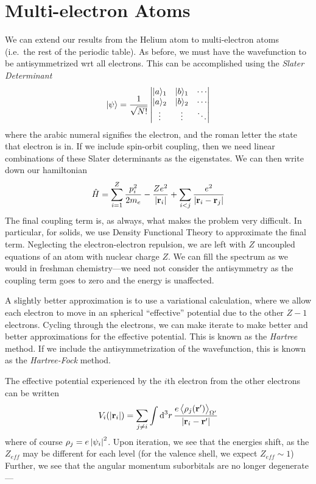 \section{Multi-electron Atoms}
We can extend our results from the Helium atom to multi-electron atoms (i.e.\ the rest of the periodic table). As before, we must have the wavefunction to be antisymmetrized wrt all electrons. This can be accomplished using the \emph{Slater Determinant}
\begin{equation}
	\lvert\psi\rangle = \frac{1}{\sqrt{N!}} \begin{vmatrix}
		\lvert a\rangle_1 & \lvert b\rangle_1 &\cdots\\
		\lvert a\rangle_2 & \lvert b\rangle_2 &\cdots\\
		\vdots & \vdots & \ddots
	\end{vmatrix}
\end{equation}
where the arabic numeral signifies the electron, and the roman letter the state that electron is in.
If we include spin-orbit coupling, then we need linear combinations of these Slater determinants as the eigenstates.
We can then write down our hamiltonian
\begin{equation}
	\hat H = \sum_{i=1}^Z\frac{p_i^2}{2m_e}-\frac{Ze^2}{\left|\mathbf{r}_i\right|}+\sum_{i<j}\frac{e^2}{\left|\mathbf{r}_i-\mathbf{r}_j\right|}
\end{equation}
The final coupling term is, as always, what makes the problem very difficult. In particular, for solids, we use Density Functional Theory to approximate the final term. Neglecting the electron-electron repulsion, we are left with \(Z\) uncoupled equations of an atom with nuclear charge \(Z\). We can fill the spectrum as we would in freshman chemistry---we need not consider the antisymmetry as the coupling term goes to zero and the energy is unaffected.

A slightly better approximation is to use a variational calculation, where we allow each electron to move in an spherical ``effective'' potential due to the other \(Z-1\) electrons. Cycling through the electrons, we can make iterate to make better and better approximations for the effective potential. This is known as the \emph{Hartree} method. If we include the antisymmetrization of the wavefunction, this is known as the \emph{Hartree-Fock} method.

The effective potential experienced by the \(i\)th electron from the other electrons can be written
\begin{equation}
	V_i(\abs{\vb r_i}) = \sum_{j\neq i}\int\d[3]{r}\frac{e\vect{\rho_j(\vb r')}_{\Omega'}}{\abs{\vb r_i-\vb r'}}
\end{equation}
where of course \(\rho_j = e\left|\psi_i\right|^2\). Upon iteration, we see that the energies shift, as the \(Z_{eff}\) may be different for each level (for the valence shell, we expect \(Z_{eff}\sim 1\)) Further, we see that the angular momentum suborbitals are no longer degenerate---

